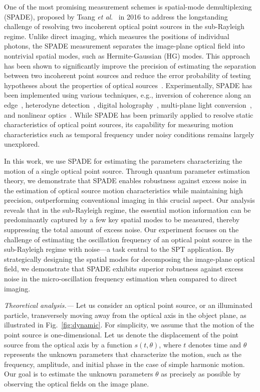 \documentclass[aps,pra,10pt,showpacs,amsmath,amssymb,floatfix,superscriptaddress,twocolumn]{revtex4-2}
\begin{document}
One of the most promising measurement schemes is spatial-mode demultiplexing (SPADE), proposed by Tsang \textit{et al}.~\cite{Tsang2016,Tsang2020} in 2016 to address the longstanding challenge of resolving two incoherent optical point sources in the sub-Rayleigh regime.
Unlike direct imaging, which measures the positions of individual photons, the SPADE measurement separates the image-plane optical field into nontrivial spatial modes, such as Hermite-Gaussian (HG) modes.
This approach has been shown to significantly improve the precision of estimating the separation between two incoherent point sources and reduce the error probability of testing hypotheses about the properties of optical sources~\cite{Lu2018,Huang2021,Bao2021}.
Experimentally, SPADE has been implemented using various techniques, e.g., inversion of coherence along an edge~\cite{Tham2017,Wadood2024}, heterodyne detection~\cite{Yang2016,Pushkina2021,Frank2023,Duplinskiy2024_published}, digital holography~\cite{Paur2016,Zhou2023,Hu2023,Peterek2023}, multi-plane light conversion~\cite{Boucher2020,Tan2023,Santamaria2023,Rouviere2024,Santamaria2024,Ozer2024}, and nonlinear optics~\cite{Darji2024}. 
While SPADE has been primarily applied to resolve static characteristics of optical point sources, its capability for measuring motion characteristics such as temporal frequency under noisy conditions remains largely unexplored.    


In this work, we use SPADE for estimating the parameters characterizing the motion of a single optical point source.
Through quantum parameter estimation theory, we demonstrate that SPADE enables robustness against excess noise in the estimation of optical source motion characteristics while maintaining high precision, outperforming conventional imaging in this crucial aspect.
Our analysis reveals that in the sub-Rayleigh regime, the essential motion information can be predominantly captured by a few key spatial modes to be measured, thereby suppressing the total amount of excess noise. 
Our experiment focuses on the challenge of estimating the oscillation frequency of an optical point source in the sub-Rayleigh regime with noise---a task central to the SPT application.
By strategically designing the spatial modes for decomposing the image-plane optical field, we demonstrate that SPADE exhibits superior robustness against excess noise in the micro-oscillation frequency estimation when compared to direct imaging.



\textit{Theoretical analysis.---}
Let us consider an optical point source, or an illuminated particle, transversely moving away from the optical axis in the object plane, as illustrated in Fig.~\ref{fig:dynamic}.
For simplicity, we assume that the motion of the point source is one-dimensional.
Let us denote the displacement of the point source from the optical axis by a function $s(t, \theta)$, where $t$ denotes time and $\theta$ represents the unknown parameters that characterize the motion, such as the frequency, amplitude, and initial phase in the case of simple harmonic motion.
Our goal is to estimate the unknown parameters $\theta$ as precisely as possible by observing the optical fields on the image plane.
\end{document}
